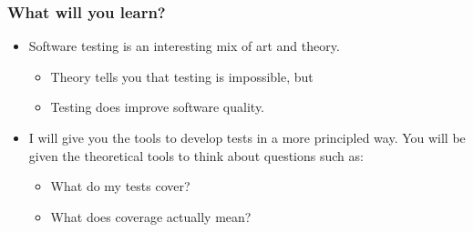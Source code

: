 \documentclass{beamer}
\begin{document}
\begin{frame}
  \frametitle{What will you learn?}
  \begin{itemize}
  \item Software testing is an interesting mix of art and theory.
    \begin{itemize}
    \item Theory tells you that testing is impossible, but
    \item Testing does improve software quality.
    \end{itemize}
  \item I will give you the tools to develop tests in a more
    principled way. You will be given the theoretical tools to think
    about questions such as:
    \begin{itemize}
    \item What do my tests cover?
    \item What does coverage actually mean? 
    \end{itemize}
  \end{itemize}
\end{frame}
\end{document}
